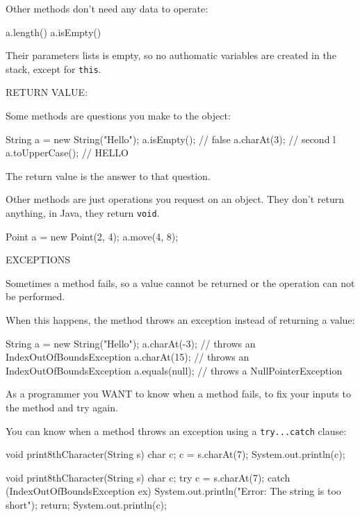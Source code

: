 \documentclass[a4paper, 9pt]{extarticle}
\begin{document}
Other methods don't need any data to operate:

\begin{blackboard}
a.length()
a.isEmpty()
\end{blackboard}

Their parameters lists is empty, so no authomatic variables are created in the
stack, except for \verb+this+.


RETURN VALUE:

Some methods are questions you make to the object:

\begin{blackboard}
String a = new String("Hello");
a.isEmpty(); // false
a.charAt(3); // second l
a.toUpperCase(); // HELLO
\end{blackboard}

The return value is the answer to that question.

Other methods are just operations you request on an object.
They don't return anything, in Java, they return \verb+void+.

\begin{blackboard}
Point a = new Point(2, 4);
a.move(4, 8);
\end{blackboard}

EXCEPTIONS

Sometimes a method fails, so a value cannot be returned or the operation can
not be performed.

When this happens, the method throws an exception instead of returning a value:

\begin{blackboard}
String a = new String("Hello");
a.charAt(-3); // throws an IndexOutOfBoundsException
a.charAt(15); // throws an IndexOutOfBoundsException
a.equals(null); // throws a NullPointerException
\end{blackboard}

As a programmer you WANT to know when a method fails, to fix your inputs to the
method and try again.

You can know when a method throws an exception using a \verb+try...catch+ clause:

\begin{multicols}{2}

\begin{blackboard}
void print8thCharacter(String s) {
  char c;
  c = s.charAt(7);
  System.out.println(c);
}
\end{blackboard}

\columnbreak

\begin{blackboard}
void print8thCharacter(String s) {
  char c;
  try {
    c = s.charAt(7);
  } catch (IndexOutOfBoundsException ex) {
    System.out.println("Error: The string is too short");
    return;
  }
  System.out.println(c);
}
\end{blackboard}
\end{multicols}
\end{document}
